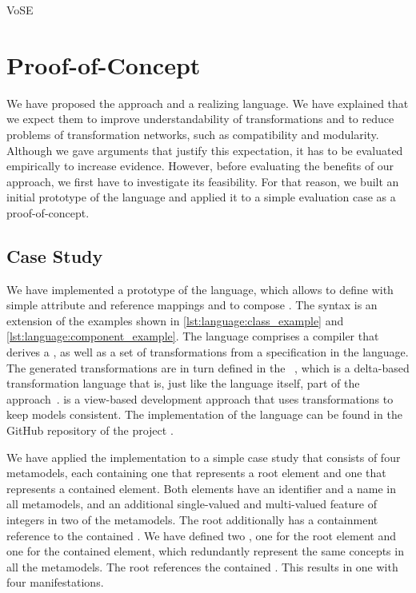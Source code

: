 \begin{copiedFrom}{VoSE}

\section*{Proof-of-Concept}

We have proposed the \commonalities approach and a realizing language.
We have explained that we expect them to improve understandability of transformations and to reduce problems of transformation networks, such as compatibility and modularity.
Although we gave arguments that justify this expectation, it has to be evaluated empirically to increase evidence.
However, before evaluating the benefits of our approach, we first have to investigate its feasibility.
For that reason, we built an initial prototype of the language and applied it to a simple evaluation case as a proof-of-concept.



\subsection*{Case Study}

We have implemented a prototype of the \commonalities language, which allows to define \commonalities with simple attribute and reference mappings and to compose \commonalities.
The syntax is an extension of the examples shown in \autoref{lst:language:class_example} and \autoref{lst:language:component_example}.
The language comprises a compiler that derives a \conceptmetamodel, as well as a set of transformations from a specification in the language.
The generated transformations are in turn defined in the \reactionslanguage~\cite{klare2016b}, which is a delta-based transformation language that is, just like the \commonalities language itself, part of the \vitruv approach~\cite{kramer2013b}.
\vitruv is a view-based development approach that uses transformations to keep models consistent.
The implementation of the \commonalities language can be found in the GitHub repository of the \vitruv project \cite{vitruvFrameworkGithub}. %

We have applied the implementation to a simple case study that consists of four metamodels, each containing one \metaclass that represents a root element and one that represents a contained element. 
Both elements have an identifier and a name in all metamodels, and an additional single-valued and multi-valued feature of integers in two of the metamodels.
The root \metaclass additionally has a containment reference to the contained \metaclass.
We have defined two \commonalities, one for the root element and one for the contained element, which redundantly represent the same concepts in all the metamodels.
The root \commonality references the contained \commonality.
This results in one \conceptmetamodel with four manifestations.


\end{copiedFrom}

